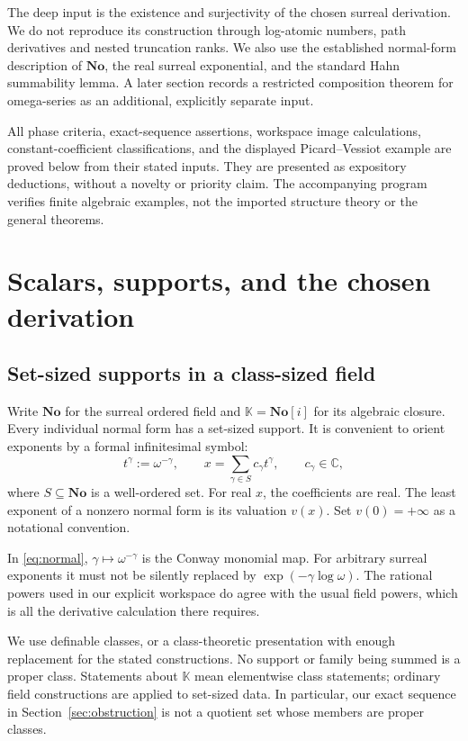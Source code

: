\documentclass[11pt,a4paper]{article}
\numberwithin{equation}{section}
\theoremstyle{definition}
\theoremstyle{remark}
\newcommand{\No}{\mathbf{No}}
\newcommand{\K}{\mathbb K}
\newcommand{\C}{\mathbb C}
\begin{document}
The deep input is the existence and surjectivity of the chosen surreal
derivation. We do not reproduce its construction through log-atomic numbers,
path derivatives and nested truncation ranks. We also use the established
normal-form description of $\No$, the real surreal exponential, and the
standard Hahn summability lemma. A later section records a restricted
composition theorem for omega-series as an additional, explicitly separate
input.

All phase criteria, exact-sequence assertions, workspace image calculations,
constant-coefficient classifications, and the displayed Picard--Vessiot
example are proved below from their stated inputs. They are presented as
expository deductions, without a novelty or priority claim. The accompanying
program verifies finite algebraic examples, not the imported structure theory
or the general theorems.

\section{Scalars, supports, and the chosen derivation}
\label{sec:setup}

\subsection{Set-sized supports in a class-sized field}

Write $\No$ for the surreal ordered field and $\K=\No[i]$ for its algebraic
closure. Every individual normal form has a set-sized support. It is
convenient to orient exponents by a formal infinitesimal symbol:
\begin{equation}\label{eq:normal}
 t^\gamma:=\omega^{-\gamma},\qquad
 x=\sum_{\gamma\in S}c_\gamma t^\gamma,
 \qquad c_\gamma\in\C,
\end{equation}
where $S\subseteq\No$ is a well-ordered set. For real $x$, the coefficients
are real. The least exponent of a nonzero normal form is its valuation
$v(x)$. Set $v(0)=+\infty$ as a notational convention.

In \eqref{eq:normal}, $\gamma\mapsto\omega^{-\gamma}$ is the Conway monomial
map. For arbitrary surreal exponents it must not be silently replaced by
$\exp(-\gamma\log\omega)$. The rational powers used in our explicit
workspace do agree with the usual field powers, which is all the derivative
calculation there requires.

We use definable classes, or a class-theoretic presentation with enough
replacement for the stated constructions. No support or family being summed
is a proper class. Statements about $\K$ mean elementwise class statements;
ordinary field constructions are applied to set-sized data. In particular,
our exact sequence in Section~\ref{sec:obstruction} is not a quotient set
whose members are proper classes.
\end{document}
